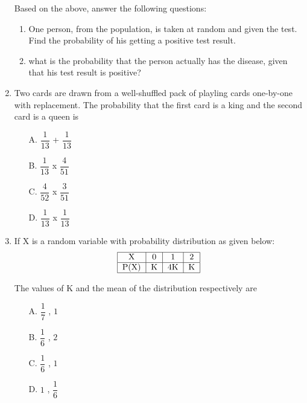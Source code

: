 \documentclass[a4paper,12pt]{article}
\begin{document}
\begin{enumerate}
Based on the above, answer the following questions:\
\begin{enumerate}
\item One person, from the population, is taken at random and  given the test. Find the probability of his getting a positive test result.

\item what is the probability that the person actually has the disease, given that his test result is positive?
\end{enumerate}

\item Two cards are drawn from a well-shuffled pack of playling cards one-by-one with replacement. The probability that the first card is a king and the second card is a queen is 

\begin{enumerate}
\item [A.] $\dfrac{1}{13}$ + $\dfrac{1}{13}$\\
\item [B.] $\dfrac{1}{13}$ x $\dfrac{4}{51}$\\
\item [C.] $\dfrac{4}{52}$ x $\dfrac{3}{51}$\\
\item [D.] $\dfrac{1}{13}$ x $\dfrac{1}{13}$\\
\end{enumerate}

\item If X is a random variable with probability distribution as given below:\\
$$\begin{tabular}{|c|c|c|c|}
\hline
X & 0 & 1 & 2 \\
\hline
P(X) & K & 4K & K \\
\hline 

\end{tabular}$$

The values  of K and the mean of the distribution respectively are\\
\begin{enumerate}
\item [A.] $\dfrac{1}{7}$ , $1$\\
\item [B.] $\dfrac{1}{6}$ , $2$\\
\item [C.] $\dfrac{1}{6}$ , $1$\\
\item [D.] $1$ , $\dfrac{1}{6}$\\
\end{enumerate}


\end{enumerate}
\end{document}
